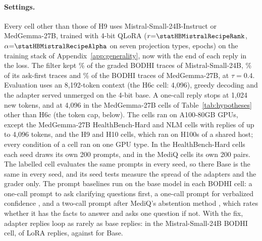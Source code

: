 \documentclass{article}
\newcommand{\bodhi}{BODHI}
\newcommand{\hbhard}{HealthBench-Hard}
\begin{document}
\paragraph{Settings.} Every cell other than those of H9 uses Mistral-Small-24B-Instruct or MedGemma-27B, trained with
4-bit QLoRA ($r{=}\statHBMistralRecipeRank$, $\alpha{=}\statHBMistralRecipeAlpha$ on seven
projection types, \statHBMistralRecipeEpochs{} epochs) on the training stack of
Appendix~\ref{app:generality}, now with the end of each reply in the loss. The filter kept
\statHBMistralFilterKeptAtTauPct\% of the \statHBMistralFilterGradedN{} graded \bodhi{} traces of
Mistral-Small-24B, \statHBMistralAskFirstFilterKeptAtTauPct\% of its ask-first traces and
\statHBMedGemmaFilterKeptAtTauPct\% of the \statHBMedGemmaFilterGradedN{} \bodhi{} traces of
MedGemma-27B, at $\tau = 0.4$. Evaluation uses an 8,192-token context (the H6c cell: 4,096), greedy
decoding and the adapter served unmerged on the 4-bit base. A one-call reply stops at 1,024 new
tokens, and at
4,096 in the MedGemma-27B cells of Table~\ref{tab:hypotheses} other than H6c (the token cap, below). The cells ran
on A100-80GB GPUs, except the MedGemma-27B \hbhard{} and NLM cells with replies of up to 4,096
tokens, and the H9 and H10 cells, which ran on H100s of a shared host; every condition of a cell ran on one GPU type. In the \hbhard{} cells each seed
draws its own 200 prompts, and in the MediQ cells its own 200 pairs. The labelled cell evaluates the
same \statHBMistralLabelledPrompts{} prompts in every seed, so there Base is the same in every seed,
and its seed tests measure the spread of the adapters and the grader only. The prompt baselines run
on the base model in each \bodhi{} cell: a one-call prompt to ask clarifying questions first, a
one-call prompt for verbalized confidence \citep{tian2023just}, and a two-call prompt after MediQ's
abstention method \citep{li2024mediq}, which rates whether it has the facts to answer and asks one
question if not. With the fix, adapter replies loop as rarely as base replies: in the
Mistral-Small-24B \bodhi{} cell,
\statHBMistralLoopsLoRA{} of \statHBMistralLoopsLoRAN{} LoRA replies, against \statHBMistralLoopsBase{}
for Base.
\end{document}
